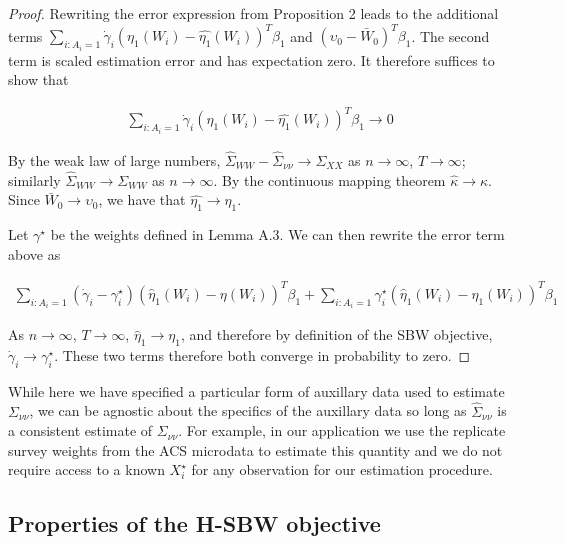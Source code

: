 \begin{proof}
Rewriting the error expression from Proposition 2 leads to the additional terms $\sum_{i: A_i = 1}\dot{\gamma}_i(\eta_1(W_i) - \hat{\eta_1}(W_i))^T\beta_1$ and $(\upsilon_0 - \bar{W}_0)^T\beta_1$. The second term is scaled estimation error and has expectation zero. It therefore suffices to show that 

\begin{align*}
\sum_{i: A_i = 1}\dot{\gamma}_i(\eta_1(W_i) - \hat{\eta_1}(W_i))^T\beta_1 \to 0
\end{align*}

By the weak law of large numbers, $\hat{\Sigma}_{WW} - \hat{\Sigma}_{\nu\nu} \to \Sigma_{XX}$ as $n \to \infty$, $T \to \infty$; similarly $\hat{\Sigma}_{WW} \to \Sigma_{WW}$ as $n \to \infty$. By the continuous mapping theorem $\hat{\kappa} \to \kappa$. Since $\bar{W}_0 \to \upsilon_0$, we have that $\hat{\eta_1} \to \eta_1$. 

Let $\gamma^\star$ be the weights defined in Lemma A.3. We can then rewrite the error term above as

\begin{align*}
\sum_{i: A_i = 1}(\dot{\gamma}_i - \gamma_i^\star)(\hat{\eta}_1(W_i) - \eta(W_i))^T\beta_1 + \sum_{i: A_i = 1}\gamma_i^\star(\hat{\eta}_1(W_i) - \eta_1(W_i))^T\beta_1
\end{align*}

As $n \to \infty$, $T \to \infty$, $\hat{\eta}_1 \to \eta_1$, and therefore by definition of the SBW objective, $\dot{\gamma}_i \to \gamma_i^\star$. These two terms therefore both converge in probability to zero. 
\end{proof}

\begin{remark}
While here we have specified a particular form of auxillary data used to estimate $\Sigma_{\nu\nu}$, we can be agnostic about the specifics of the auxillary data so long as $\hat{\Sigma}_{\nu\nu}$ is a consistent estimate of $\Sigma_{\nu\nu}$. For example, in our application we use the replicate survey weights from the ACS microdata to estimate this quantity and we do not require access to a known $X_i^\star$ for any observation for our estimation procedure.
\end{remark}

\subsection{Properties of the H-SBW objective}

